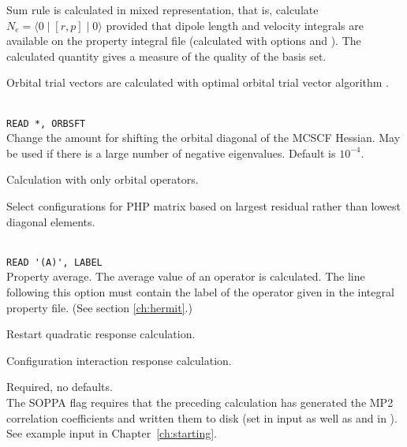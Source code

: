 \begin{description}
\item{}
Sum rule is calculated in mixed representation, that is, calculate
$N_e=\langle0\mid [r,p] \mid0\rangle$ provided that dipole length and
velocity integrals are available on the property integral file 
(calculated with  options  and ).
The calculated quantity gives a measure of the quality of the basis
set.

\item{}
Orbital trial vectors are calculated with optimal orbital
trial vector
algorithm \cite{tuhjahjajpjjcp84}.

\item{}\\
\verb|READ *, ORBSFT|\\
Change the amount for shifting the orbital
diagonal of the MCSCF Hessian.
May be used if there is a large number of negative eigenvalues.
Default is $10^{-4}$. 

\item{}
Calculation with only orbital operators. 

\item{}
Select configurations for PHP matrix based on largest residual
rather than lowest diagonal elements.

\item{} \\
\verb|READ '(A)', LABEL|\\
Property average. The average value of an
operator is calculated. 
The line following this option must contain the
label of the operator given in the integral property file.
(See section \ref{ch:hermit}.)

\item{}
Restart quadratic response
calculation.

\item{}
Configuration interaction
response calculation. 

\item{}
Required, no defaults. \\
The SOPPA flag requires that
the preceding {\sir} calculation has generated the MP2 correlation
coefficients and written them to disk (set  in 
input as well as  and  in ). See
example input in Chapter~\ref{ch:starting}.


\end{description}
